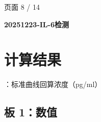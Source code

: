 \documentclass[UTF8,10pt,a4paper,fontset=fandol]{ctexart}
\begin{document}

\newpage

\begin{flushright}
页面 8 / 14
\end{flushright}

\noindent\textbf{20251223-IL-6检测}

\section*{计算结果}

：标准曲线回算浓度（pg/ml）

\subsection*{板 1：数值}
\end{document}
